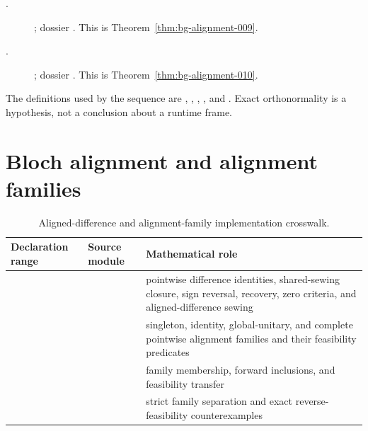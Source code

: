 \begin{description}
  \item[.]
    ;
    dossier .
    This is Theorem~\ref{thm:bg-alignment-009}.

  \item[.]
    ;
    dossier .
    This is Theorem~\ref{thm:bg-alignment-010}.
\end{description}

The definitions used by the sequence are
, , ,
, and . Exact
orthonormality is a hypothesis, not a conclusion about a runtime frame.

\section{Bloch alignment and alignment families}

\begin{table}[ht]
\centering
\small
\begin{tabularx}{\textwidth}{@{}Z Y Y@{}}
\toprule
Declaration range & Source module & Mathematical role \\
\midrule
{}
  & 
  & pointwise difference identities, shared-sewing closure, sign reversal, recovery,
    zero criteria, and aligned-difference sewing \\
  & 
  & singleton, identity, global-unitary, and complete pointwise alignment families and
    their feasibility predicates \\
  & 
  & family membership, forward inclusions, and feasibility transfer \\
  & 
  & strict family separation and exact reverse-feasibility counterexamples \\
\bottomrule
\end{tabularx}
\caption{Aligned-difference and alignment-family implementation crosswalk.}
\label{tab:alignment-family-implementation-crosswalk}
\end{table}


